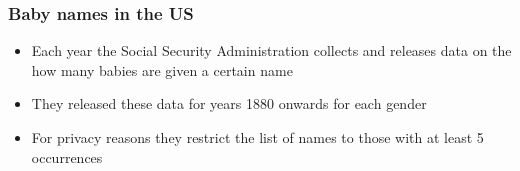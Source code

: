 \documentclass[slidestop,compress,mathserif,12pt,t,professionalfonts,xcolor=table]{beamer}
\begin{document}
\begin{frame}
\frametitle{Baby names in the US}

\begin{itemize}

\item Each year the Social Security Administration collects and releases data on the how many babies are given a certain name

\item They released these data for years 1880 onwards for each gender

\item For privacy reasons they restrict the list of names to those with at least 5 occurrences

\end{itemize}


\end{frame}

\end{document}
